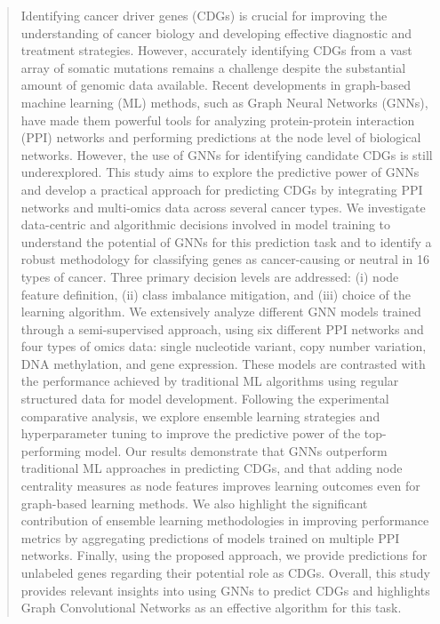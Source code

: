 \documentclass[ppgc, diss, english]{iiufrgs}
\begin{document}
\begin{abstract}
Identifying cancer driver genes (CDGs) is crucial for improving the understanding of cancer biology and developing effective diagnostic and treatment strategies. However, accurately identifying CDGs from a vast array of somatic mutations remains a challenge despite the substantial amount of genomic data available. Recent developments in graph-based machine learning (ML) methods, such as Graph Neural Networks (GNNs), have made them powerful tools for analyzing protein-protein interaction (PPI) networks and performing predictions at the node level of biological networks. However, the use of GNNs for identifying candidate CDGs is still underexplored. This study aims to explore the predictive power of GNNs and develop a practical approach for predicting CDGs by integrating PPI networks and multi-omics data across several cancer types. We investigate data-centric and algorithmic decisions involved in model training to understand the potential of GNNs for this prediction task and to identify a robust methodology for classifying genes as cancer-causing or neutral in 16 types of cancer. Three primary decision levels are addressed: (i) node feature definition, (ii) class imbalance mitigation, and (iii) choice of the learning algorithm. 
We extensively analyze different GNN models trained through a semi-supervised approach, using six different PPI networks and four types of omics data: single nucleotide variant, copy number variation, DNA methylation, and gene expression. These models are contrasted with the performance achieved by traditional ML algorithms using regular structured data for model development. Following the experimental comparative analysis, we explore ensemble learning strategies and hyperparameter tuning to improve the predictive power of the top-performing model. 
Our results demonstrate that GNNs outperform traditional ML approaches in predicting CDGs, and that adding node centrality measures as node features improves learning outcomes even for graph-based learning methods. We also highlight the significant contribution of ensemble learning methodologies in improving performance metrics by aggregating predictions of models trained on multiple PPI networks. Finally, using the proposed approach, we provide predictions for unlabeled genes regarding their potential role as CDGs. 
Overall, this study provides relevant insights into using GNNs to predict CDGs and highlights Graph Convolutional Networks as an effective algorithm for this task.

\end{abstract}
\end{document}
